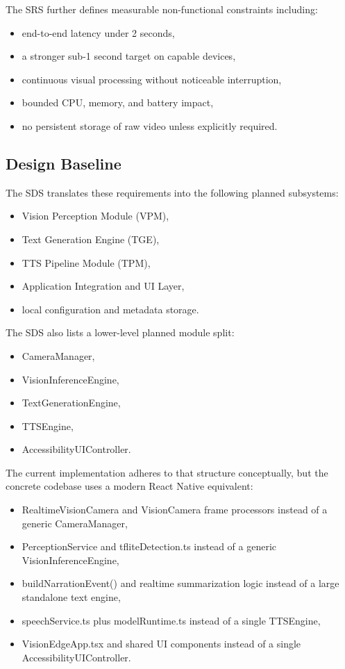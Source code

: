 \documentclass[conference]{IEEEtran}
\newcommand{\modname}[1]{\textsf{#1}}
\begin{document}
The SRS further defines measurable non-functional constraints including:
\begin{itemize}[leftmargin=1.2em]
\item end-to-end latency under 2 seconds,
\item a stronger sub-1 second target on capable devices,
\item continuous visual processing without noticeable interruption,
\item bounded CPU, memory, and battery impact,
\item no persistent storage of raw video unless explicitly required.
\end{itemize}

\subsection{Design Baseline}
The SDS translates these requirements into the following planned subsystems:
\begin{itemize}[leftmargin=1.2em]
\item Vision Perception Module (VPM),
\item Text Generation Engine (TGE),
\item TTS Pipeline Module (TPM),
\item Application Integration and UI Layer,
\item local configuration and metadata storage.
\end{itemize}

The SDS also lists a lower-level planned module split:
\begin{itemize}[leftmargin=1.2em]
\item CameraManager,
\item VisionInferenceEngine,
\item TextGenerationEngine,
\item TTSEngine,
\item AccessibilityUIController.
\end{itemize}

The current implementation adheres to that structure conceptually, but the concrete codebase uses a modern React Native equivalent:
\begin{itemize}[leftmargin=1.2em]
\item \modname{RealtimeVisionCamera} and VisionCamera frame processors instead of a generic CameraManager,
\item \modname{PerceptionService} and \modname{tfliteDetection.ts} instead of a generic VisionInferenceEngine,
\item \modname{buildNarrationEvent()} and realtime summarization logic instead of a large standalone text engine,
\item \modname{speechService.ts} plus \modname{modelRuntime.ts} instead of a single TTSEngine,
\item \modname{VisionEdgeApp.tsx} and shared UI components instead of a single AccessibilityUIController.
\end{itemize}
\end{document}
